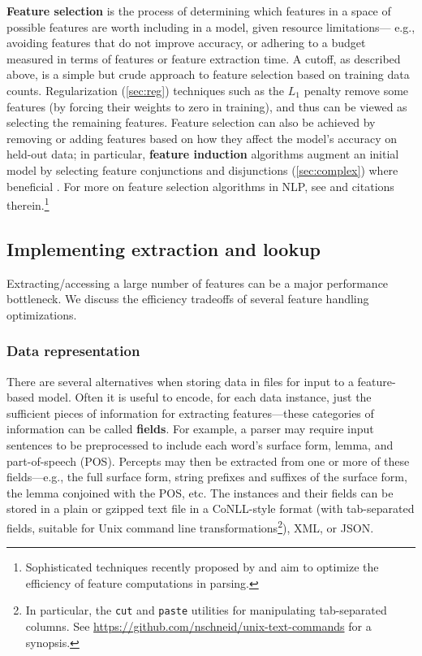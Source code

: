 \documentclass[11pt,letterpaper]{article}
\begin{document}
\textbf{Feature selection} is the process of determining which features in a space of possible features 
are worth including in a model, given resource limitations---%
e.g., avoiding features that do not improve accuracy, or 
adhering to a budget measured in terms of features or feature extraction time.
A cutoff, as described above, is a simple but crude approach to feature selection based on training data counts.
Regularization (\cref{sec:reg}) techniques such as the $L_1$ penalty 
remove some features (by forcing their weights to zero in training), 
and thus can be viewed as selecting the remaining features.
Feature selection can also be achieved by 
removing or adding features based on how they affect the model's accuracy on held-out data;
in particular, \textbf{feature induction} algorithms augment an initial model 
by selecting feature conjunctions and disjunctions (\cref{sec:complex}) where beneficial \citep{della_pietra-97,mccallum-03}.
For more on feature selection algorithms in NLP, see \citet{collins-05} and citations therein.\footnote{Sophisticated 
techniques recently proposed by \citet{he-13} and \citet{weiss-13} aim to optimize 
the efficiency of feature computations in parsing.}

\subsection{Implementing extraction and lookup}

Extracting/accessing a large number of features can be a major performance bottleneck. 
We discuss the efficiency tradeoffs of several feature handling optimizations.

\subsubsection{Data representation}\label{sec:datarep}

There are several alternatives when storing data in files for input to a feature-based model. 
Often it is useful to encode, for each data instance, just the sufficient pieces of information 
for extracting features---these categories of information can be called \textbf{fields}. 
For example, a parser may require input sentences to be preprocessed 
to include each word's surface form, lemma, and part-of-speech (POS). 
Percepts may then be extracted from one or more of these fields---e.g., the full surface form, 
string prefixes and suffixes of the surface form, the lemma conjoined with the POS, etc. 
The instances and their fields can be stored in a plain or gzipped text file 
in a CoNLL-style format (with tab-separated fields, suitable for Unix command line transformations\footnote{In particular, 
the \texttt{cut} and \texttt{paste} utilities for manipulating tab-separated columns. See \url{https://github.com/nschneid/unix-text-commands} for a synopsis.}), 
XML, or JSON.
\end{document}
